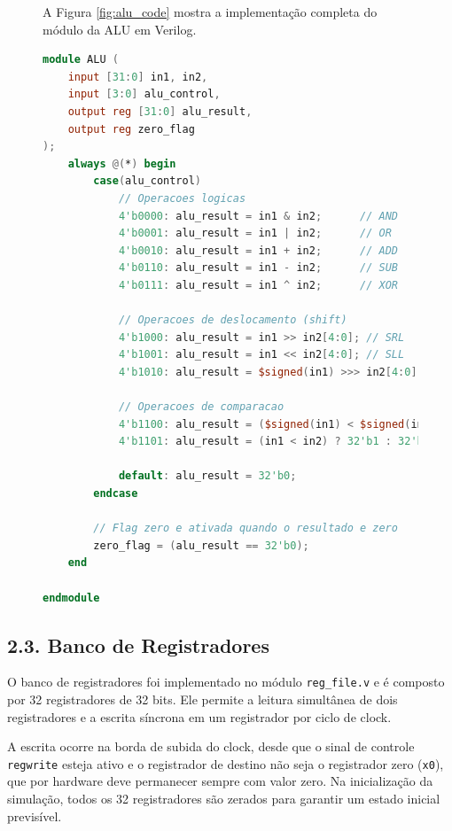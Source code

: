 \documentclass[12pt, a4paper]{article}
\begin{document}
\begin{figure}[h!]

A Figura \ref{fig:alu_code} mostra a implementação completa do módulo da ALU em Verilog.

\begin{lstlisting}[language=Verilog, caption={Implementação da Unidade Lógica e Aritmética (ALU)}, label={fig:alu_code}]
module ALU (
    input [31:0] in1, in2, 
    input [3:0] alu_control,
    output reg [31:0] alu_result,
    output reg zero_flag
);
    always @(*) begin
        case(alu_control)
            // Operacoes logicas
            4'b0000: alu_result = in1 & in2;      // AND
            4'b0001: alu_result = in1 | in2;      // OR
            4'b0010: alu_result = in1 + in2;      // ADD
            4'b0110: alu_result = in1 - in2;      // SUB
            4'b0111: alu_result = in1 ^ in2;      // XOR
            
            // Operacoes de deslocamento (shift)
            4'b1000: alu_result = in1 >> in2[4:0]; // SRL
            4'b1001: alu_result = in1 << in2[4:0]; // SLL
            4'b1010: alu_result = $signed(in1) >>> in2[4:0]; // SRA
            
            // Operacoes de comparacao
            4'b1100: alu_result = ($signed(in1) < $signed(in2)) ? 32'b1 : 32'b0;  // SLT
            4'b1101: alu_result = (in1 < in2) ? 32'b1 : 32'b0;  // SLTU
            
            default: alu_result = 32'b0;
        endcase

        // Flag zero e ativada quando o resultado e zero
        zero_flag = (alu_result == 32'b0);
    end
    
endmodule
\end{lstlisting}
\end{figure}

\clearpage

\subsection*{2.3. Banco de Registradores}

O banco de registradores foi implementado no módulo \texttt{reg\_file.v} e é composto por 32 registradores de 32 bits. Ele permite a leitura simultânea de dois registradores e a escrita síncrona em um registrador por ciclo de clock.

A escrita ocorre na borda de subida do clock, desde que o sinal de controle \texttt{regwrite} esteja ativo e o registrador de destino não seja o registrador zero (\texttt{x0}), que por hardware deve permanecer sempre com valor zero. Na inicialização da simulação, todos os 32 registradores são zerados para garantir um estado inicial previsível.
\end{document}
